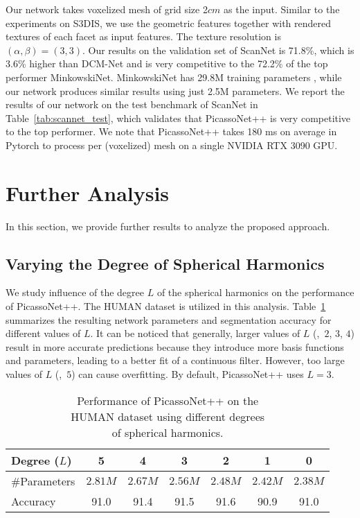 Our network takes voxelized mesh of grid size 2$cm$ as the input. 
{\color{black}Similar to the experiments on S3DIS, we use the geometric features together with rendered textures of each facet as input features. The texture resolution is  $(\alpha,\beta)=(3,3)$.
Our results on the validation set of ScanNet is 71.8\%,} which is 3.6\% higher than DCM-Net and is very competitive to the 72.2\% of the top performer MinkowskiNet. MinkowskiNet has 29.8M training parameters \cite{xie2020pointcontrast}, while our network produces similar results using just {\color{black}2.5M parameters}. We report the results of our network on the test benchmark of ScanNet in Table~\ref{tab:scannet_test}, which validates that PicassoNet++ is very competitive to the top performer. {\color{black}We note that 
PicassoNet++ takes 180 ms on average in Pytorch to process per (voxelized) mesh on a single NVIDIA RTX 3090 GPU.}

\section{Further Analysis}
\label{sec:ablation}
In this section, we provide further results to analyze the proposed approach. 
\vspace{-2mm}
{\color{black}
\subsection{Varying the Degree of Spherical Harmonics}
We study influence of the degree $L$ of the spherical harmonics on the performance of PicassoNet++. The HUMAN dataset is utilized in this analysis. Table~\ref{tab:diff_spharm_degree} summarizes the resulting network parameters and segmentation accuracy for different values of $L$. It can be noticed that generally, larger values of $L$ (\eg,~$2$, $3$, $4$) result in more accurate predictions because they introduce more basis functions and parameters, leading to a better fit of a continuous filter. However, too large values of $L$ (\eg,~$5$) can cause overfitting. By default, PicassoNet++ uses $L=3$. 

\begin{table}[t]
\centering
\caption{\color{black}Performance of PicassoNet++ on the \\HUMAN dataset using different degrees \\of spherical harmonics.}\label{tab:diff_spharm_degree}
\vspace{-1.5mm}
\begin{adjustbox}{width=0.48\textwidth}
{
\large
\begin{tabular}{l|c|c|c|c|c|c}
\hline
Degree ($L$) & 5 & 4 & 3 &2 & 1 & 0\\
\hline 
\#Parameters &$2.81M$ & $2.67M$& $2.56M$& $2.48M$ & $2.42M$ & $2.38M$ \\ 
\hline
Accuracy & 91.0 & 91.4& 91.5 & 91.6& 90.9& 91.0\\
\hline
\end{tabular}
}
\end{adjustbox}
\vspace{-2mm}
\end{table}}

